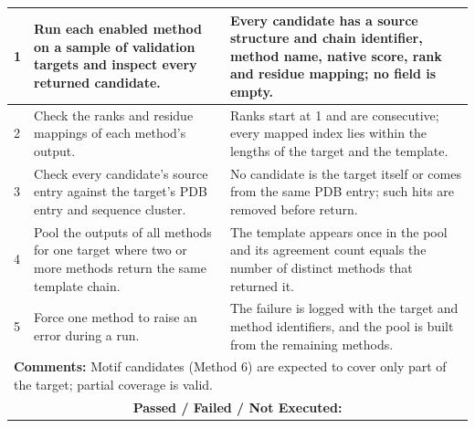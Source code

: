\documentclass{FastFyp}
\begin{document}
{\begin{longtable}{|p{2.4cm}|p{4.6cm}|p{2.4cm}|p{3.8cm}|}
1 & Run each enabled method on a sample of validation targets and inspect every returned candidate. & \multicolumn{2}{p{6.64cm}|}{Every candidate has a source structure and chain identifier, method name, native score, rank and residue mapping; no field is empty.} \\ \hline
2 & Check the ranks and residue mappings of each method's output. & \multicolumn{2}{p{6.64cm}|}{Ranks start at 1 and are consecutive; every mapped index lies within the lengths of the target and the template.} \\ \hline
3 & Check every candidate's source entry against the target's PDB entry and sequence cluster. & \multicolumn{2}{p{6.64cm}|}{No candidate is the target itself or comes from the same PDB entry; such hits are removed before return.} \\ \hline
4 & Pool the outputs of all methods for one target where two or more methods return the same template chain. & \multicolumn{2}{p{6.64cm}|}{The template appears once in the pool and its agreement count equals the number of distinct methods that returned it.} \\ \hline
5 & Force one method to raise an error during a run. & \multicolumn{2}{p{6.64cm}|}{The failure is logged with the target and method identifiers, and the pool is built from the remaining methods.} \\ \hline
\multicolumn{4}{|p{14.51cm}|}{\textbf{Comments:} Motif candidates (Method 6) are expected to cover only part of the target; partial coverage is valid.} \\ \hline
\multicolumn{4}{|c|}{\textbf{Passed / Failed / Not Executed:}} \\ \hline
\end{longtable}
}
\end{document}
